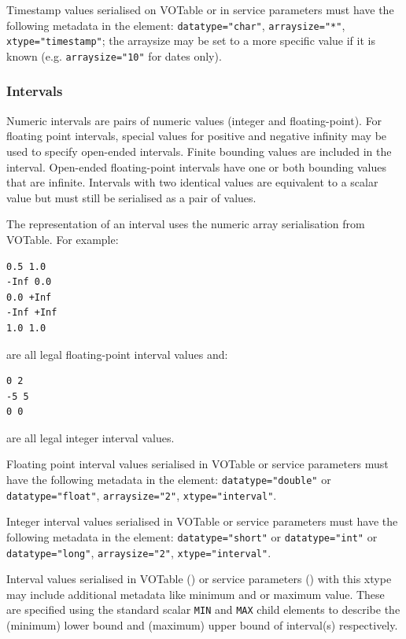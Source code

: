 \documentclass[11pt,letter]{ivoa}
\begin{document}
Timestamp values serialised on VOTable or in service parameters must have the following metadata in 
the  element: \verb|datatype="char"|,  \verb|arraysize="*"|,
\verb|xtype="timestamp"|; the arraysize may be set to a more specific value if it is known (e.g. 
\verb|arraysize="10"| for dates only).
 
\subsubsection{Intervals}
Numeric intervals are pairs of numeric values (integer and floating-point). For floating point 
intervals, special values for positive and negative infinity may be used to specify open-ended intervals. 
Finite bounding values are included in the interval. Open-ended floating-point 
intervals have one or both bounding values that are infinite. Intervals with two identical values
are equivalent to a scalar value but must still be serialised as a pair of values.

The representation of an interval uses the numeric array serialisation from 
VOTable. For example:

\begin{verbatim}
0.5 1.0
-Inf 0.0
0.0 +Inf
-Inf +Inf
1.0 1.0
\end{verbatim}

\noindent are all legal floating-point interval values and:

\begin{verbatim}
0 2
-5 5
0 0
\end{verbatim}

\noindent are all legal integer interval values. 

Floating point interval values serialised in VOTable or service parameters must have the following metadata in the 
 element: \verb|datatype="double"| or \verb|datatype="float"|, 
\verb|arraysize="2"|, \verb|xtype="interval"|.

Integer interval values serialised in VOTable or service parameters must have the following metadata in the 
 element: \verb|datatype="short"| or \verb|datatype="int"| or 
\verb|datatype="long"|, \verb|arraysize="2"|, \verb|xtype="interval"|.

Interval values serialised in VOTable () or service parameters
() with this xtype may include additional metadata like minimum and
or maximum value. These are specified using the standard scalar \verb|MIN| and
\verb|MAX| child elements to describe the (minimum) lower bound and (maximum)
upper bound of interval(s) respectively.
\end{document}
